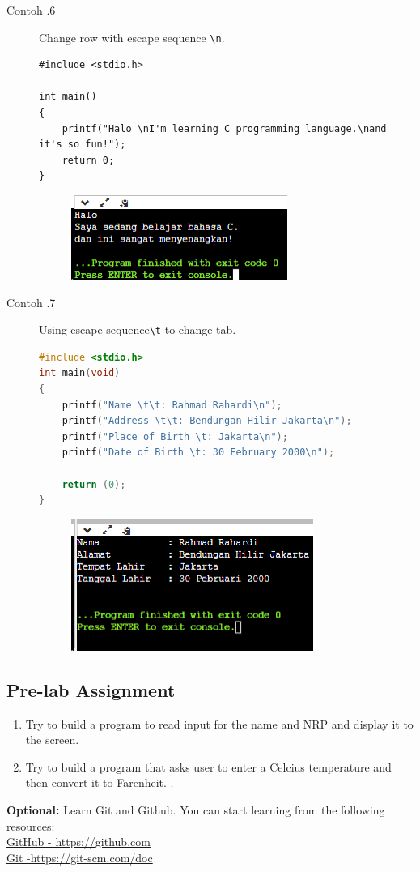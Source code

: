 \begin{description}
	\item[Contoh \thesubsection.6] Change row with escape sequence \verb*|\n|.
	\begin{lstlisting}
#include <stdio.h>

int main() 
{
	printf("Halo \nI'm learning C programming language.\nand it's so fun!");
	return 0;
}
	\end{lstlisting}
\begin{figure}[H]
	\centering
	\includegraphics[width=0.5\linewidth]{../P1/img/screenshot0006.png}
	\caption{}
	\label{fig:screenshot0006}
\end{figure}

\item[Contoh \thesubsection.7] Using escape sequence\verb*|\t| to change tab.
\begin{lstlisting}[language=c]
#include <stdio.h>
int main(void)
{
	printf("Name \t\t: Rahmad Rahardi\n");
	printf("Address \t\t: Bendungan Hilir Jakarta\n");
	printf("Place of Birth \t: Jakarta\n");
	printf("Date of Birth \t: 30 February 2000\n");
	
	return (0);
}
\end{lstlisting}
\begin{figure}[H]
	\centering
	\includegraphics[width=0.5\linewidth]{../P1/img/screenshot0007.png}
	\caption{}
	\label{fig:screenshot0007}
\end{figure}
\end{description}

\subsection{Pre-lab Assignment}
\begin{enumerate}
	\item Try to build a program to read input for the name and NRP and display it to the screen.
	\item Try to build a program that asks user to enter a Celcius temperature and then convert it to Farenheit.  .
\end{enumerate}

\begin{center}
    \colorbox{cyan!30}{\parbox{0.8\linewidth}{\textbf{Optional:} Learn Git and Github. You can start learning from the following resources: \\ \href{https://github.com}{GitHub - https://github.com} \\ \href{https://git-scm.com/doc}{Git -https://git-scm.com/doc}}}
\end{center}